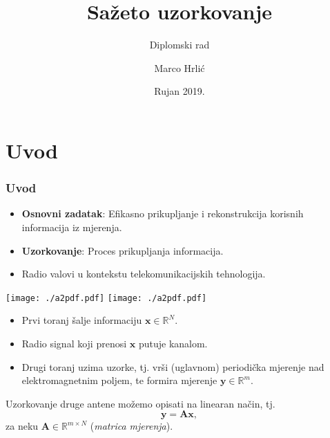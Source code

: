 \documentclass{beamer}
\title[Naslov] %
{Sa\v{z}eto uzorkovanje}
\subtitle{Diplomski rad}
\author[Marco, Hrli\'c] %
{Marco Hrli\'c}
\institute[VFU] %
{
    Prirodoslovno matemati\v{c}ki fakultet\\
    Sveu\v{c}ili\v{s}te u Zagrebu
}
\date[datum] %
{Rujan 2019.}
\newcommand{\R}{\mathbb{R}}
\newcommand{\vect}[1]{\mathbf{#1}}
\renewcommand{\vec}{\vect}
\begin{document}
\frame{\titlepage}




\section{Uvod}

\begin{frame}
\frametitle{Uvod}
\begin{itemize}
    \item \textbf{Osnovni zadatak}: Efikasno prikupljanje i rekonstrukcija korisnih informacija iz mjerenja.
    \item \textbf{Uzorkovanje}: Proces prikupljanja informacija.
    \item Radio valovi u kontekstu telekomunikacijskih tehnologija.
\end{itemize}
\vfill
\texttt{[image: ./a2pdf.pdf]}
\hfill
\texttt{[image: ./a2pdf.pdf]}
\end{frame}

\begin{frame}
    \begin{itemize}
        \item Prvi toranj \v{s}alje informaciju $\vec x \in \R^{N}$. 
        \item Radio signal koji prenosi $\vec x$ putuje kanalom.
    \item Drugi toranj uzima uzorke, tj. vr\v{s}i (uglavnom) periodi\v{c}ka mjerenje nad elektromagnetnim poljem, te formira mjerenje $\vec y \in \R^m$.
    \end{itemize}
    \vfill
    Uzorkovanje druge antene mo\v{z}emo opisati na linearan na\v{c}in, tj.
    \begin{equation*}
        \vec y = \vec{Ax}, 
    \end{equation*}
    za neku $\vec A \in \R^{m \times N}$ (\textit{matrica mjerenja}).
\end{frame}
\end{document}
